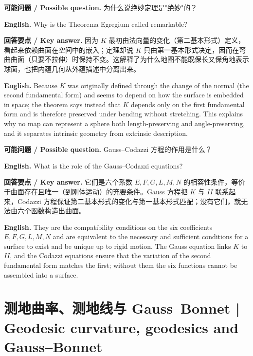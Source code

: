 \documentclass[UTF8,11pt,a4paper]{ctexart}
\newcommand{\EN}[1]{\par\noindent \textbf{English.} #1\par}
\newcommand{\ASK}[4]{\par\noindent \textbf{可能问题 / Possible question.} #1\par\EN{#2}\noindent \textbf{回答要点 / Key answer.} #3\par\EN{#4}\medskip}
\begin{document}
\ASK{为什么说绝妙定理是"绝妙"的？}{Why is the Theorema Egregium called remarkable?}{因为 $K$ 最初由法向量的变化（第二基本形式）定义，看起来依赖曲面在空间中的嵌入；定理却说 $K$ 只由第一基本形式决定，因而在弯曲曲面（只要不拉伸）时保持不变。这解释了为什么地图不能既保长又保角地表示球面，也把内蕴几何从外蕴描述中分离出来。}{Because $K$ was originally defined through the change of the normal (the second fundamental form) and seems to depend on how the surface is embedded in space; the theorem says instead that $K$ depends only on the first fundamental form and is therefore preserved under bending without stretching. This explains why no map can represent a sphere both length-preserving and angle-preserving, and it separates intrinsic geometry from extrinsic description.}
\ASK{Gauss--Codazzi 方程的作用是什么？}{What is the role of the Gauss--Codazzi equations?}{它们是六个系数 $E,F,G,L,M,N$ 的相容性条件，等价于曲面存在且唯一（到刚体运动）的充要条件。Gauss 方程把 $K$ 与 $II$ 联系起来，Codazzi 方程保证第二基本形式的变化与第一基本形式匹配；没有它们，就无法由六个函数构造出曲面。}{They are the compatibility conditions on the six coefficients $E,F,G,L,M,N$ and are equivalent to the necessary and sufficient conditions for a surface to exist and be unique up to rigid motion. The Gauss equation links $K$ to $II$, and the Codazzi equations ensure that the variation of the second fundamental form matches the first; without them the six functions cannot be assembled into a surface.}

\section[测地几何]{测地曲率、测地线与 Gauss--Bonnet | Geodesic curvature, geodesics and Gauss--Bonnet}
\end{document}
